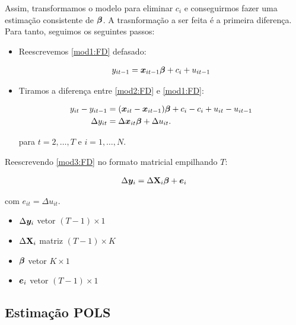\documentclass[11pt, oneside, a4paper, article]{article}
\numberwithin{equation}{section}
\begin{document}
Assim, transformamos o modelo para eliminar $c_{i}$ e conseguirmos fazer uma estimação consistente de $\boldsymbol{\beta}$.
A trasnformação a ser feita é a primeira diferença.
Para tanto, seguimos os seguintes passos:

\begin{itemize}\itemsep0pt
\item Reescrevemos \eqref{mod1:FD} defasado:

\vspace{-1 em}
\begin{align}  \label{mod2:FD}
	y_{it-1} = \boldsymbol{x}_{it-1} \boldsymbol{\beta} + c_{i} + u_{it-1}
\end{align}

\item Tiramos a diferença entre \eqref{mod2:FD} e \eqref{mod1:FD}:

\vspace{-1 em}
\begin{align}
\nonumber
y_{it} - y_{it-1} &=
(\boldsymbol{x}_{it} - \boldsymbol{x}_{it-1}) \boldsymbol{\beta} +
c_{i} - c_{i} +
u_{it} - u_{it-1}
\\
\label{mod3:FD}
\Delta y_{it} &=
\Delta \boldsymbol{x}_{it} \boldsymbol{\beta} +
\Delta u_{it}. 
\end{align}

\noindent
para
$t = 2, \dots, T$ e $i = 1, \dots, N$.
\end{itemize}

Reescrevendo \eqref{mod3:FD} no formato matricial empilhando $T$:

\vspace{-1 em}
\begin{align} \label{mod4:FD}
	\Delta \boldsymbol{y}_{i} = \Delta \mathbf{X}_{i} \boldsymbol{\beta} + \boldsymbol{e}_{i}
\end{align}

\noindent
com 
$\boxed{e_{it} = \Delta u_{it}}$.

\begin{itemize}\itemsep0pt
\item
$\Delta \boldsymbol{y}_{i}$ vetor $( T - 1 ) \times 1$ 
\item
$\Delta \mathbf{X}_{i}$  matriz  $( T - 1 ) \times K$
\item
$\boldsymbol{\beta}$ vetor $K \times 1$
\item
$\boldsymbol{e}_{i}$ vetor $(T - 1 ) \times 1$
\end{itemize}


\subsection{Estimação POLS}
\end{document}
